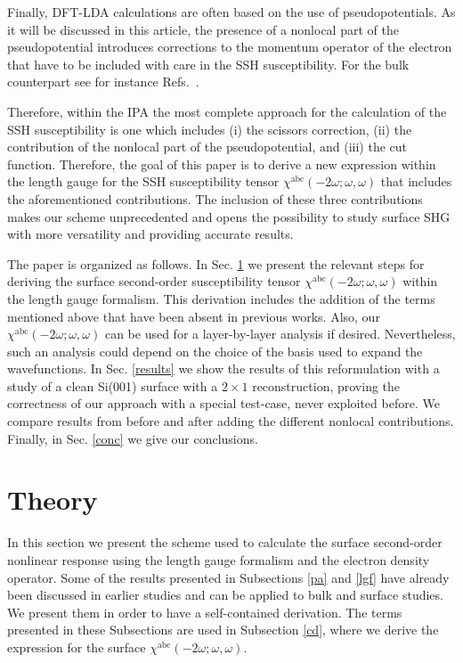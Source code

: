 \documentclass[floatfix,prb,aps,superscriptaddress,showpacs,11pt,preprint,letterpaper]{revtex4}
\begin{document}
Finally, DFT-LDA calculations are often based on the use of pseudopotentials.
As it will be discussed 
in this article, the presence of a nonlocal part of the
pseudopotential introduces
corrections to
the momentum operator of the electron that have to be included with care in 
the SSH susceptibility. 
For the bulk counterpart see for instance Refs.~.  

Therefore, within the IPA the most complete approach for the calculation of 
the SSH susceptibility is one which includes (i) the scissors correction, 
(ii) the contribution of the nonlocal part of the 
pseudopotential, and
(iii) the cut function.
 Therefore, the goal of this paper is to derive a new 
expression within the length gauge for the SSH susceptibility tensor 
$\chi^{\mathrm{a}\mathrm{b}\mathrm{c}}(-2\omega;\omega,\omega)$ 
that includes the aforementioned contributions. The inclusion of these three 
contributions makes our scheme unprecedented and opens the possibility to 
study surface SHG with more versatility and providing accurate results. 

The paper is organized as follows. In Sec. \ref{theory} we present the 
relevant steps for deriving the surface second-order susceptibility tensor
$\chi^{\mathrm{a}\mathrm{b}\mathrm{c}}(-2\omega;\omega,\omega)$ within the 
length gauge formalism. This derivation includes the addition of the terms 
mentioned above that have been absent in previous works. Also, our 
$\chi^{\mathrm{a}\mathrm{b}\mathrm{c}}(-2\omega;\omega,\omega)$ can be used 
for a layer-by-layer analysis if desired. 
Nevertheless, such an analysis could depend on the choice of the basis
used to expand the wavefunctions.
In Sec. \ref{results} we show the 
results of this reformulation with a study of a clean Si(001) surface with a 
$2 \times 1$ reconstruction, 
proving the correctness of our approach with a special test-case,
never exploited before.
We compare results from before and after adding 
the different nonlocal contributions. Finally, in Sec. \ref{conc} we give 
our conclusions.

\section{Theory}

\label{theory}

In this section we present the scheme used to calculate the surface 
second-order nonlinear response using the length gauge formalism and
the electron 
density operator. 
Some of the results presented  in Subsections \ref{pa} and \ref{lgf}
have already been discussed in earlier
studies and can be applied to bulk and surface studies.\cite{sipePRB00,cabellosPRB09}
We present them in order to have a self-contained derivation.
The terms presented in these Subsections are used in Subsection \ref{cd}, 
where we derive the expression 
for the surface $\chi^{\mathrm{a}\mathrm{b}\mathrm{c}}(-2\omega;\omega,\omega)$.    
\end{document}
